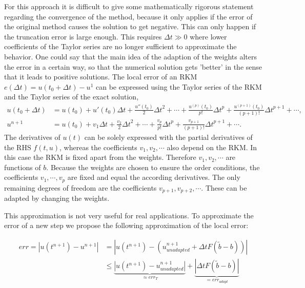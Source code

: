 \documentclass[a4paper]{article}
\numberwithin{equation}{section}
\theoremstyle{plain}
\theoremstyle{definition}
\numberwithin{theorem}{section}
\newcommand{\dt}{{\Delta t}}
\newcommand{\1}{\mathbbm{1}}
\begin{document}
For this approach it is difficult to give some mathematically rigorous statement regarding the convergence of the method, because it only applies if the error of the original method causes the solution to get negative. This can only happen if the truncation error is large enough. This requires $\dt \gg 0$ where lower coefficients of the Taylor series are no longer sufficient to approximate the behavior. 
One could say that the main idea of the adaption of the weights alters the error in a certain way, so that the numerical solution gets 'better' in the sense that it leads to positive solutions. 
The local error of an RKM $e(\dt) =u(t_0 + \dt) - u^1$ can be expressed using the Taylor series of the RKM and the Taylor series of the exact solution, %
\begin{align}\label{eq:Taylor_sol_ref}
u(t_0 + \dt) &= u(t_0) + u'(t_0) \dt + \frac{u''(t_0)}{2} \dt^2 + \cdots + \frac{u^{(p)}(t_0)}{p!} \dt^p + \frac{u^{(p+1)}(t_0)}{(p+1)!} \dt^{p+1} + \cdots, \\
u^{n+1} &= u(t_0)  + v_1 \dt + \frac{v_2}{2} \dt^2 + \cdots + \frac{v_p}{p!} \dt^p + \frac{v_{p+1}}{(p+1)!} \dt^{p+1} + \cdots .
\end{align}
The derivatives of $u(t)$ can be solely expressed with the partial derivatives of the RHS $f(t,u)$, whereas the coefficients $v_1,v_2,\cdots$ also depend on the RKM. 
In this case the RKM is fixed apart from the weights. 
Therefore $v_1,v_2,\cdots$ are functions of $b$.
Because the weights are chosen to ensure the order conditions, the coefficients $v_1,\cdots,v_p$ are fixed and equal the according derivatives.
The only remaining degrees of freedom are the coefficients $v_{p+1},v_{p+2},\cdots$.
These can be adapted by changing the weights.

This approximation is not very useful for real applications. 
To approximate the error of a new step we propose the following approximation of the local error:

\begin{align}
err = |u(t^{n+1})-u^{n+1}| &= |u(t^{n+1}) - (u^{n+1}_{unadapted}+\dt F(\tilde{b}-b))| \\
 &\leq \underbrace{|u(t^{n+1})-u^{n+1}_{unadapted}|}_{\approx err_T}+\underbrace{|\dt F(\tilde{b}-b)|}_{= err_{adapt}} \label{eq:Err}
\end{align}
\end{document}
